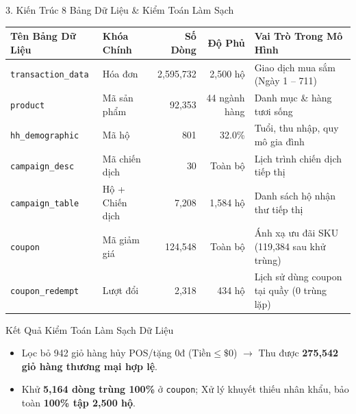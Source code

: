 \documentclass[aspectratio=169, 10pt]{beamer}
\begin{document}
\begin{frame}{3. Kiến Trúc 8 Bảng Dữ Liệu \& Kiểm Toán Làm Sạch}
  \centering
  \footnotesize
  \setlength{\tabcolsep}{4pt}
  \begin{tabular}{llrrl}
    \toprule
    \textbf{Tên Bảng Dữ Liệu} & \textbf{Khóa Chính} & \textbf{Số Dòng} & \textbf{Độ Phủ} & \textbf{Vai Trò Trong Mô Hình} \\
    \midrule
    \texttt{transaction\_data} & Hóa đơn & 2,595,732 & 2,500 hộ & Giao dịch mua sắm (Ngày 1 -- 711) \\
    \texttt{product} & Mã sản phẩm & 92,353 & 44 ngành hàng & Danh mục \& hàng tươi sống \\
    \texttt{hh\_demographic} & Mã hộ & 801 & 32.0\% & Tuổi, thu nhập, quy mô gia đình \\
    \texttt{campaign\_desc} & Mã chiến dịch & 30 & Toàn bộ & Lịch trình chiến dịch tiếp thị \\
    \texttt{campaign\_table} & Hộ + Chiến dịch & 7,208 & 1,584 hộ & Danh sách hộ nhận thư tiếp thị \\
    \texttt{coupon} & Mã giảm giá & 124,548 & Toàn bộ & Ánh xạ ưu đãi SKU (119,384 sau khử trùng) \\
    \texttt{coupon\_redempt} & Lượt đổi & 2,318 & 434 hộ & Lịch sử dùng coupon tại quầy (0 trùng lặp) \\
    \bottomrule
  \end{tabular}
  \vspace{0.2cm}
  \begin{alertblock}{Kết Quả Kiểm Toán Làm Sạch Dữ Liệu}
    \small
    \begin{itemize}\setlength{\itemsep}{2pt}
      \item Lọc bỏ 942 giỏ hàng hủy POS/tặng 0đ ($\text{Tiền} \le \$0$) $\rightarrow$ Thu được \textbf{275,542 giỏ hàng thương mại hợp lệ}.
      \item Khử \textbf{5,164 dòng trùng 100\%} ở \texttt{coupon}; Xử lý khuyết thiếu nhân khẩu, bảo toàn \textbf{100\% tập 2,500 hộ}.
    \end{itemize}
  \end{alertblock}
\end{frame}
\end{document}
